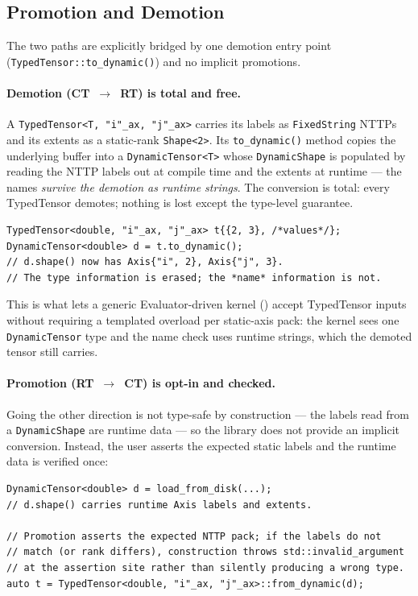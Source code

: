 \documentclass[10pt,twocolumn]{article}
\newcommand{\code}[1]{\texttt{#1}}
\begin{document}
\subsection{Promotion and Demotion}
\label{sec:hybrid-promo}

The two paths are explicitly bridged by one demotion entry point
(\code{TypedTensor::to\_dynamic()}) and no implicit promotions.

\paragraph{Demotion (CT~$\to$~RT) is total and free.}
A \code{TypedTensor<T, "i"\_ax, "j"\_ax>} carries its labels as
\code{FixedString} NTTPs and its extents as a static-rank
\code{Shape<2>}. Its \code{to\_dynamic()} method copies the underlying
buffer into a \code{DynamicTensor<T>} whose \code{DynamicShape} is
populated by reading the NTTP labels out at compile time and the
extents at runtime --- the names \emph{survive the demotion as
runtime strings}. The conversion is total: every TypedTensor demotes;
nothing is lost except the type-level guarantee.

\begin{lstlisting}[language=cppx]
TypedTensor<double, "i"_ax, "j"_ax> t{{2, 3}, /*values*/};
DynamicTensor<double> d = t.to_dynamic();
// d.shape() now has Axis{"i", 2}, Axis{"j", 3}.
// The type information is erased; the *name* information is not.
\end{lstlisting}

This is what lets a generic Evaluator-driven kernel
() accept TypedTensor inputs without requiring a
templated overload per static-axis pack: the kernel sees one
\code{DynamicTensor} type and the name check uses runtime strings,
which the demoted tensor still carries.

\paragraph{Promotion (RT~$\to$~CT) is opt-in and checked.}
Going the other direction is not type-safe by construction --- the
labels read from a \code{DynamicShape} are runtime data --- so the
library does not provide an implicit conversion. Instead, the user
asserts the expected static labels and the runtime data is verified
once:

\begin{lstlisting}[language=cppx]
DynamicTensor<double> d = load_from_disk(...);
// d.shape() carries runtime Axis labels and extents.

// Promotion asserts the expected NTTP pack; if the labels do not
// match (or rank differs), construction throws std::invalid_argument
// at the assertion site rather than silently producing a wrong type.
auto t = TypedTensor<double, "i"_ax, "j"_ax>::from_dynamic(d);
\end{lstlisting}
\end{document}
